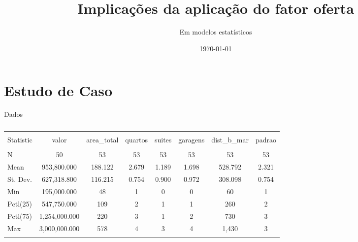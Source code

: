 \documentclass[9pt,ignorenonframetext,aspectratio=169]{beamer}
\title[]{Implicações da aplicação do fator oferta}
\subtitle{Em modelos estatísticos}
\author[
        Luiz Fernando Palin Droubi\footnote<.->{\href{mailto:lfpdroubi@gmail.com}{\nolinkurl{lfpdroubi@gmail.com}}}
\newline \and Carlos Augusto Zilli\footnote<.->{\href{mailto:carlos.zilli@ifsc.edu.br}{\nolinkurl{carlos.zilli@ifsc.edu.br}}}
\newline \and Willian Zonato\footnote<.->{\href{mailto:will.zonato@gmail.com}{\nolinkurl{will.zonato@gmail.com}}}
\newline \and Norberto Hochheim\footnote<.->{\href{mailto:norberto.hochheim@ufsc.br}{\nolinkurl{norberto.hochheim@ufsc.br}}}
    ]{Luiz Fernando Palin Droubi\footnote<.->{\href{mailto:lfpdroubi@gmail.com}{\nolinkurl{lfpdroubi@gmail.com}}}
\newline \and Carlos Augusto Zilli\footnote<.->{\href{mailto:carlos.zilli@ifsc.edu.br}{\nolinkurl{carlos.zilli@ifsc.edu.br}}}
\newline \and Willian Zonato\footnote<.->{\href{mailto:will.zonato@gmail.com}{\nolinkurl{will.zonato@gmail.com}}}
\newline \and Norberto Hochheim\footnote<.->{\href{mailto:norberto.hochheim@ufsc.br}{\nolinkurl{norberto.hochheim@ufsc.br}}}}
\institute[
    ]{
    GEAP - UFSC
    }
\date[
      \today
  ]{
      \today
        }
\begin{document}
  \begin{frame}[plain]
  \titlepage
  \end{frame}


  \begin{frame}
  \tableofcontents[hideallsubsections]
  \end{frame}

\hypertarget{estudo-de-caso}{%
\section{Estudo de Caso}\label{estudo-de-caso}}

\begin{frame}{Dados}
\protect\hypertarget{dados}{}

\begin{table}[!htbp] \centering 
  \caption{} 
  \label{} 
\begin{tabular}{@{\extracolsep{5pt}}lccccccc} 
\\[-1.8ex]\hline 
\hline \\[-1.8ex] 
Statistic & valor & area\_total & quartos & suites & garagens & dist\_b\_mar & padrao \\ 
\hline \\[-1.8ex] 
N & 50 & 53 & 53 & 53 & 53 & 53 & 53 \\ 
Mean & 953,800.000 & 188.122 & 2.679 & 1.189 & 1.698 & 528.792 & 2.321 \\ 
St. Dev. & 627,318.800 & 116.215 & 0.754 & 0.900 & 0.972 & 308.098 & 0.754 \\ 
Min & 195,000.000 & 48 & 1 & 0 & 0 & 60 & 1 \\ 
Pctl(25) & 547,750.000 & 109 & 2 & 1 & 1 & 260 & 2 \\ 
Pctl(75) & 1,254,000.000 & 220 & 3 & 1 & 2 & 730 & 3 \\ 
Max & 3,000,000.000 & 578 & 4 & 3 & 4 & 1,430 & 3 \\ 
\hline \\[-1.8ex] 
\end{tabular} 
\end{table}

\end{frame}
\end{document}
